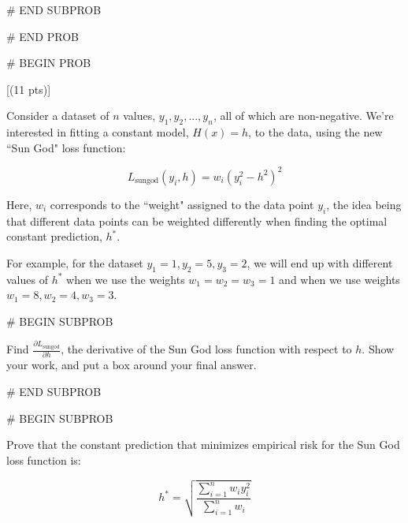 \documentclass[twoside,12pt]{article}
\begin{document}
{{# END SUBPROB
    

    


# END PROB

\newpage

# BEGIN PROB

[(11 pts)]

Consider a dataset of $n$ values, $y_1, y_2, ..., y_n$, all of which are non-negative. We're interested in fitting a constant model, $H(x) = h$, to the data, using the new ``Sun God" loss function:

$$L_\text{sungod}(y_i, h) = w_i \left( y_i^2 - h^2  \right)^2$$

Here, $w_i$ corresponds to the ``weight" assigned to the data point $y_i$, the idea being that different data points can be weighted differently when finding the optimal constant prediction, $h^*$. 

\vspace{0.1in}

For example, for the dataset $y_1 = 1, y_2 = 5, y_3 = 2$, we will end up with different values of $h^*$ when we use the weights $w_1 = w_2 = w_3 = 1$ and when we use weights $w_1 = 8, w_2 = 4, w_3 = 3$.



# BEGIN SUBPROB

 Find $\frac{\partial L_\text{sungod}}{\partial h}$, the derivative of the Sun God loss function with respect to $h$. Show your work, and put a $\boxed{\text{box}}$ around your final answer.

\begin{responsebox}{3in}

\end{responsebox}
    


# END SUBPROB

\newpage

# BEGIN SUBPROB

 Prove that the constant prediction that minimizes empirical risk for the Sun God loss function is:

$$h^* = \sqrt{\frac{\sum_{i = 1}^n w_i y_i^2}{\sum_{i = 1}^n w_i}}$$


}}
\end{document}
